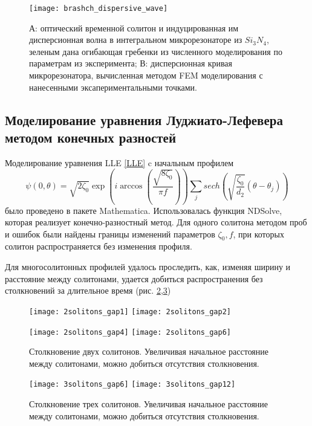 \begin{figure}
  \centering
  \texttt{[image: brashch\_dispersive\_wave]}

  \caption{А: оптический временной солитон и индуцированная им дисперсионная волна в интегральном микрорезонаторе из $Si_3N_4$, зеленым дана огибающая гребенки из численного моделирования по параметрам из эксперимента; В: дисперсионная кривая микрорезонатора, вычисленная методом FEM моделирования с нанесенными эксапериментальными точками.} \label{brashch_dispersive_wave}
\end{figure}


\subsection{Моделирование уравнения Луджиато-Лефевера методом конечных разностей}

Моделирование уравнения LLE \eqref{LLE} c начальным профилем
\begin{equation} \label{initial_cond_soliton}
\psi(0,\theta)=\sqrt{2\zeta_0}\exp (i \arccos(\frac{\sqrt{8\zeta_0}}{\pi f}))\sum_j sech(\sqrt{\frac{\zeta_0}{d_2}}(\theta-\theta_j))
\end{equation}
было проведено в пакете Mathematica. Использовалась функция NDSolve, которая реализует конечно-разностный метод. Для одного солитона методом проб и ошибок были найдены границы изменений параметров $\zeta_0,f$, при которых солитон распространяется без изменения профиля.

Для многосолитонных профилей удалось проследить, как, изменяя ширину и расстояние между солитонами, удается добиться распространения без столкновений за длительное время (рис. \ref{2solitons},\ref{3solitons})
\begin{figure}
  \texttt{[image: 2solitons\_gap1]}
  \texttt{[image: 2solitons\_gap2]}
\end{figure}

\begin{figure}
  \texttt{[image: 2solitons\_gap4]}
  \texttt{[image: 2solitons\_gap6]}
  \caption{Столкновение двух солитонов. Увеличивая начальное расстояние между солитонами, можно добиться отсутствия столкновения.} \label{2solitons}
\end{figure}

\begin{figure}

  \texttt{[image: 3solitons\_gap6]}
  \texttt{[image: 3solitons\_gap12]}
  \caption{Столкновение трех солитонов. Увеличивая начальное расстояние между солитонами, можно добиться отсутствия столкновения.} \label{3solitons}
\end{figure}


